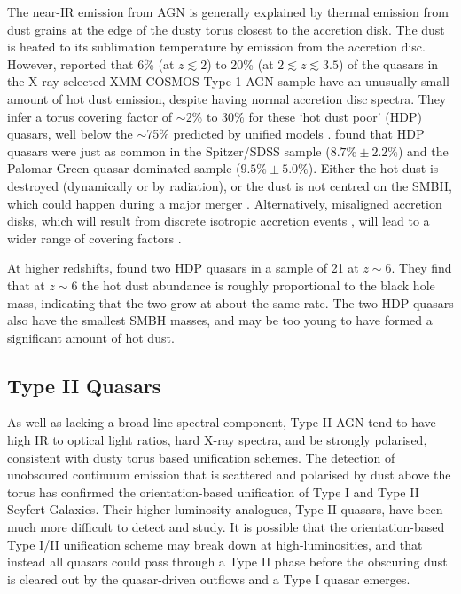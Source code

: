 The near-IR emission from AGN is generally explained by thermal emission from dust grains at the edge of the dusty torus closest to the accretion disk. 
The dust is heated to its sublimation temperature \citep[1300-2000K][]{barvainis92} by emission from the accretion disc. However, \citet{hao10} reported that 6\% (at $z \lesssim 2$) to 20\% (at $2 \lesssim z \lesssim 3.5$) of the quasars in the X-ray selected XMM-COSMOS Type 1 AGN sample \citep{brusa10} have an unusually small amount of hot dust emission, despite having normal accretion disc spectra. 
They infer a torus covering factor of  $\sim$2\% to 30\% for these `hot dust poor' (HDP) quasars, well below the $\sim$75\% predicted by unified models \citep[e.g.][]{krolik88}. 
\citet{hao11} found that HDP quasars were just as common in the \citet{richards06} Spitzer/SDSS sample ($8.7\% \pm 2.2\%$) and the \citet{elvis94} Palomar-Green-quasar-dominated sample ($9.5\% \pm 5.0\%$). 
Either the hot dust is destroyed (dynamically or by radiation), or the dust is not centred on the SMBH, which could happen during a major merger \citep[e.g.][]{blecha11}. 
Alternatively, misaligned accretion disks, which will result from discrete isotropic accretion events \citep{volonteri07}, will lead to a wider range of covering factors \citep{lawrence10}. 

At higher redshifts, \citet{jiang10} found two HDP quasars in a sample of 21 at $z\sim6$. 
They find that at $z\sim6$ the hot dust abundance is roughly proportional to the black hole mass, indicating that the two grow at about the same rate. 
The two HDP quasars also have the smallest SMBH masses, and may be too young to have formed a significant amount of hot dust.

\subsection{Type II Quasars}

As well as lacking a broad-line spectral component, Type II AGN tend to have high IR to optical light ratios, hard X-ray spectra, and be strongly polarised, consistent with dusty torus based unification schemes. 
The detection of unobscured continuum emission that is scattered and polarised by dust above the torus has confirmed the orientation-based unification of Type I and Type II Seyfert Galaxies. 
Their higher luminosity analogues, Type II quasars, have been much more difficult to detect and study. 
It is possible that the orientation-based Type I/II unification scheme may break down at high-luminosities, and that instead all quasars could pass through a Type II phase before the obscuring dust is cleared out by the quasar-driven outflows and a Type I quasar emerges.  



